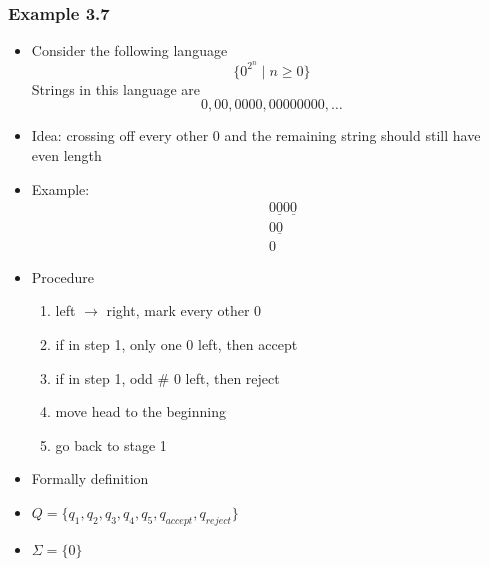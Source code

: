 




\begin{frame}[allowframebreaks] \frametitle{Example 3.7}
  \begin{itemize}
\item Consider the following language
  \begin{equation*}
\{0^{2^n}\mid n \geq 0\}
\end{equation*}
Strings in this language are
\begin{equation*}
0,00,0000,00000000, \ldots
\end{equation*}
\item Idea: crossing off every other 0 and the remaining string should
  still have even length
\item Example:
  \begin{eqnarray*}
&& 0\underline{0} 0\underline{0}\\
&& 0\underline{0}\\
&& 0
  \end{eqnarray*}
\item Procedure
  \begin{enumerate}
  \item left $\rightarrow$ right, mark every other 0
  \item if in step 1, only one 0 left, then accept
  \item if in step 1, odd \# 0 left, then reject
\item move head to the beginning
\item go back to stage 1
  \end{enumerate}

\item Formally definition

\item [] $Q=\{q_1, q_2, q_3, q_4, q_5, q_{accept}, q_{reject}\}$

\item [] $\Sigma=
  \{0\}$


\end{itemize}
\end{frame}
